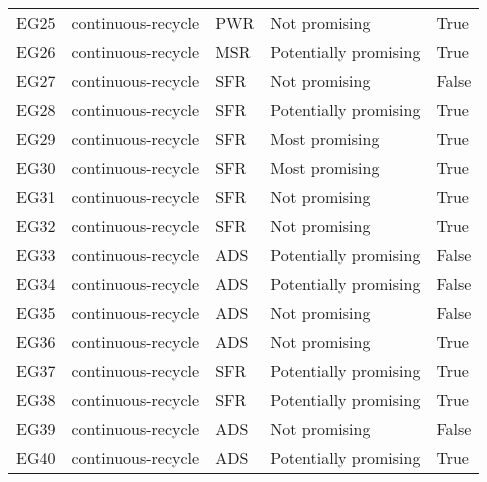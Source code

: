 \begin{tabular}{lllll}
EG25 & continuous-recycle & PWR & Not promising & True \\
EG26 & continuous-recycle & MSR & Potentially promising & True \\
EG27 & continuous-recycle & SFR & Not promising & False \\
EG28 & continuous-recycle & SFR & Potentially promising & True \\
EG29 & continuous-recycle & SFR & Most promising & True \\
EG30 & continuous-recycle & SFR & Most promising & True \\
EG31 & continuous-recycle & SFR & Not promising & True \\
EG32 & continuous-recycle & SFR & Not promising & True \\
\rowcolor{yellow}
EG33 & continuous-recycle & ADS & Potentially promising & False \\
\rowcolor{yellow}
EG34 & continuous-recycle & ADS & Potentially promising & False \\
EG35 & continuous-recycle & ADS & Not promising & False \\
EG36 & continuous-recycle & ADS & Not promising & True \\
EG37 & continuous-recycle & SFR & Potentially promising & True \\
EG38 & continuous-recycle & SFR & Potentially promising & True \\
EG39 & continuous-recycle & ADS & Not promising & False \\
EG40 & continuous-recycle & ADS & Potentially promising & True \\
\bottomrule
\end{tabular}
